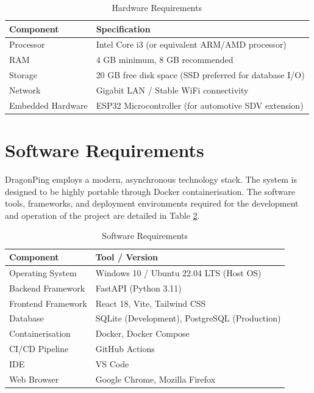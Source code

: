 \documentclass[12pt,a4paper,oneside]{report}
\begin{document}
\begin{table}[H]
\centering
\begin{tabularx}{0.85\textwidth}{|l|X|}
\hline
\textbf{Component} & \textbf{Specification} \\
\hline
Processor & Intel Core i3 (or equivalent ARM/AMD processor) \\
\hline
RAM & 4 GB minimum, 8 GB recommended \\
\hline
Storage & 20 GB free disk space (SSD preferred for database I/O) \\
\hline
Network & Gigabit LAN / Stable WiFi connectivity \\
\hline
Embedded Hardware & ESP32 Microcontroller (for automotive SDV extension) \\
\hline
\end{tabularx}
\caption{Hardware Requirements}
\label{tab:hardware}
\end{table}

\section{Software Requirements}
\noindent DragonPing employs a modern, asynchronous technology stack. The system is designed to be highly portable through Docker containerisation. The software tools, frameworks, and deployment environments required for the development and operation of the project are detailed in Table \ref{tab:software}.

\begin{table}[H]
\centering
\begin{tabularx}{0.85\textwidth}{|l|X|}
\hline
\textbf{Component} & \textbf{Tool / Version} \\
\hline
Operating System & Windows 10 / Ubuntu 22.04 LTS (Host OS) \\
\hline
Backend Framework & FastAPI (Python 3.11) \\
\hline
Frontend Framework & React 18, Vite, Tailwind CSS \\
\hline
Database & SQLite (Development), PostgreSQL (Production) \\
\hline
Containerisation & Docker, Docker Compose \\
\hline
CI/CD Pipeline & GitHub Actions \\
\hline
IDE & VS Code \\
\hline
Web Browser & Google Chrome, Mozilla Firefox \\
\hline
\end{tabularx}
\caption{Software Requirements}
\label{tab:software}
\end{table}
\end{document}
